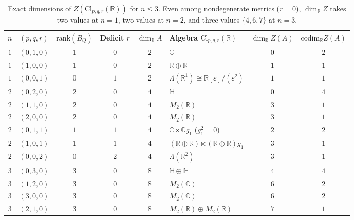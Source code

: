 \documentclass[11pt,a4paper]{article}
\theoremstyle{definition}
\theoremstyle{remark}
\newcommand{\Cl}{\mathrm{Cl}}
\newcommand{\codim}{\mathrm{codim}}
\newcommand{\rank}{\mathrm{rank}}
\begin{document}
\begin{table}[ht]
\centering
\small
\begin{tabular}{@{}ccccclcc@{}}
\toprule
$n$ & $(p, q, r)$ & $\rank(B_Q)$ & Deficit $r$ & $\dim_{\mathbb{R}} A$ & Algebra $\Cl_{p,q,r}(\mathbb{R})$ & $\dim_{\mathbb{R}} Z(A)$ & $\codim_{\mathbb{R}} Z(A)$ \\
\midrule
$1$ & $(0, 1, 0)$ & $1$ & $0$ & $2$ & $\mathbb{C}$ & $0$ & $2$ \\
$1$ & $(1, 0, 0)$ & $1$ & $0$ & $2$ & $\mathbb{R} \oplus \mathbb{R}$ & $1$ & $1$ \\
$1$ & $(0, 0, 1)$ & $0$ & $1$ & $2$ & $\Lambda(\mathbb{R}^1) \cong \mathbb{R}[\varepsilon]/(\varepsilon^2)$ & $1$ & $1$ \\
\midrule
$2$ & $(0, 2, 0)$ & $2$ & $0$ & $4$ & $\mathbb{H}$ & $0$ & $4$ \\
$2$ & $(1, 1, 0)$ & $2$ & $0$ & $4$ & $M_2(\mathbb{R})$ & $3$ & $1$ \\
$2$ & $(2, 0, 0)$ & $2$ & $0$ & $4$ & $M_2(\mathbb{R})$ & $3$ & $1$ \\
$2$ & $(0, 1, 1)$ & $1$ & $1$ & $4$ & $\mathbb{C} \ltimes \mathbb{C} g_1$ ($g_1^2 = 0$) & $2$ & $2$ \\
$2$ & $(1, 0, 1)$ & $1$ & $1$ & $4$ & $(\mathbb{R} \oplus \mathbb{R}) \ltimes (\mathbb{R} \oplus \mathbb{R}) g_1$ & $3$ & $1$ \\
$2$ & $(0, 0, 2)$ & $0$ & $2$ & $4$ & $\Lambda(\mathbb{R}^2)$ & $3$ & $1$ \\
\midrule
$3$ & $(0, 3, 0)$ & $3$ & $0$ & $8$ & $\mathbb{H} \oplus \mathbb{H}$ & $4$ & $4$ \\
$3$ & $(1, 2, 0)$ & $3$ & $0$ & $8$ & $M_2(\mathbb{C})$ & $6$ & $2$ \\
$3$ & $(3, 0, 0)$ & $3$ & $0$ & $8$ & $M_2(\mathbb{C})$ & $6$ & $2$ \\
$3$ & $(2, 1, 0)$ & $3$ & $0$ & $8$ & $M_2(\mathbb{R}) \oplus M_2(\mathbb{R})$ & $7$ & $1$ \\
\bottomrule
\end{tabular}
\caption{Exact dimensions of $Z(\Cl_{p,q,r}(\mathbb{R}))$ for $n \le 3$. Even among nondegenerate metrics ($r = 0$), $\dim_{\mathbb{R}} Z$ takes two values at $n = 1$, two values at $n = 2$, and three values $\{4, 6, 7\}$ at $n = 3$.}
\label{tab:clifford-dims}
\end{table}
\end{document}
